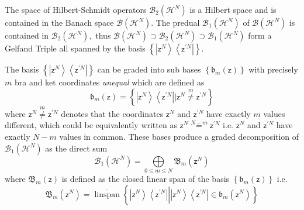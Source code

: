 \documentclass[aps,preprint]{revtex4}%
\begin{document}
The space of Hilbert-Schmidt operators $\mathcal{B}_{2}\left(  \mathcal{H}%
^{N}\right)  $ is a Hilbert space and is contained in the Banach space
$\mathcal{B}\left(  \mathcal{H}^{N}\right)  $. The predual $\mathcal{B}%
_{1}\left(  \mathcal{H}^{N}\right)  $ of $\mathcal{B}\left(  \mathcal{H}%
^{N}\right)  $ is contained in $\mathcal{B}_{2}\left(  \mathcal{H}^{N}\right)
,$ thus $\mathcal{B}\left(  \mathcal{H}^{N}\right)  \supset\mathcal{B}%
_{2}\left(  \mathcal{H}^{N}\right)  \supset\mathcal{B}_{1}\left(
\mathcal{H}^{N}\right)  $ form a Gelfand Triple all spanned by the basis
$\left\{  \left\vert \mathsf{z}^{N}\right\rangle \left\langle \mathsf{z}%
^{\prime N}\right\vert \right\}  $.

The basis $\left\{  \left\vert \mathsf{z}^{N}\right\rangle \left\langle
\mathsf{z}^{\prime N}\right\vert \right\}  $ can be graded into sub bases
$\left\{  \mathfrak{b}_{m}\left(  \mathsf{z}\right)  \right\}  $ with
precisely $m$ bra and ket coordinates \emph{unequal} which are defined as
\begin{equation}
\mathfrak{b}_{m}\left(  \mathsf{z}\right)  =\left\{  \left\vert \mathsf{z}%
^{N}\right\rangle \left\langle \mathsf{z}^{\prime N}\right\vert |\mathsf{z}%
^{N}\overset{m}{\neq}\mathsf{z}^{\prime N}\right\}
\end{equation}
where $\mathsf{z}^{N}\overset{m}{\neq}\mathsf{z}^{\prime N}$ denotes that the
coordinates $\mathsf{z}^{N}$ and $\mathsf{z}^{\prime N}$ have exactly $m$
values different, which could be equivalently written as $\mathsf{z}%
^{N}\overset{N-m}{=}\mathsf{z}^{\prime N}$ i.e. $\mathsf{z}^{N}$ and
$\mathsf{z}^{\prime N}$ have exactly $N-m$ values in common. These bases
produce a graded decomposition of $\mathcal{B}_{1}\left(  \mathcal{H}%
^{N}\right)  $ as the direct sum
\begin{equation}
\mathcal{B}_{1}\left(  \mathcal{H}^{N}\right)  =%
{\displaystyle\bigoplus\limits_{0\leq m\leq N}}
\mathfrak{B}_{m}\left(  \mathsf{z}^{N}\right)
\end{equation}
where $\mathfrak{B}_{m}\left(  \mathsf{z}\right)  $ is defined as the closed
linear span of the basis $\left\{  \mathfrak{b}_{m}\left(  \mathsf{z}\right)
\right\}  $ i.e.
\begin{equation}
\mathfrak{B}_{m}\left(  \mathsf{z}^{N}\right)  =\overline
{\operatorname{linspan}}\left\{  \left.  \underset{}{\left\vert \mathsf{z}%
^{N}\right\rangle \left\langle \mathsf{z}^{\prime N}\right\vert }\right\vert
\left\vert \mathsf{z}^{N}\right\rangle \left\langle \mathsf{z}^{\prime
N}\right\vert \in\mathfrak{b}_{m}\left(  \mathsf{z}^{N}\right)  \right\}
\end{equation}
\end{document}
